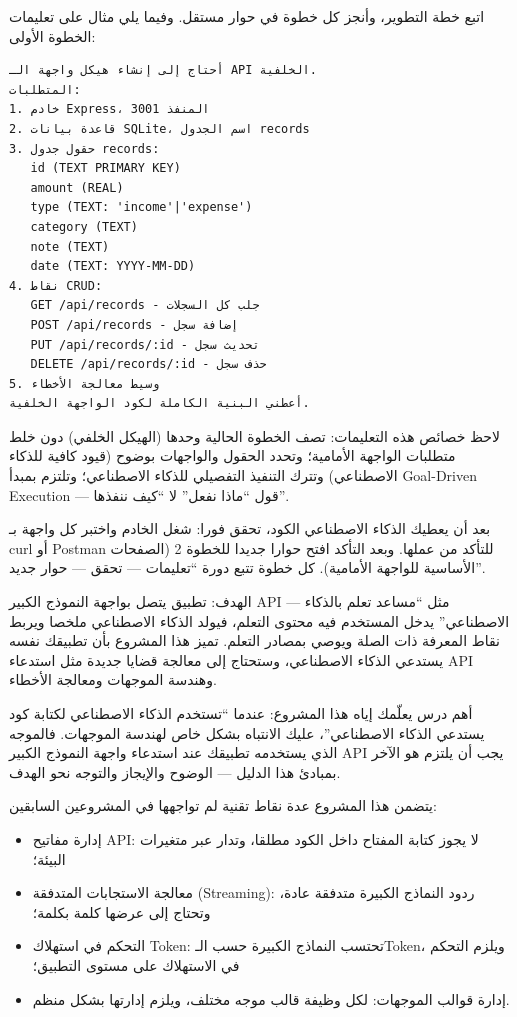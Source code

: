 
اتبع خطة التطوير، وأنجز كل خطوة في حوار مستقل. وفيما يلي مثال على تعليمات الخطوة الأولى:

\begin{lstlisting}
أحتاج إلى إنشاء هيكل واجهة الـ API الخلفية.
المتطلبات:
1. خادم Express، المنفذ 3001
2. قاعدة بيانات SQLite، اسم الجدول records
3. حقول جدول records:
   id (TEXT PRIMARY KEY)
   amount (REAL)
   type (TEXT: 'income'|'expense')
   category (TEXT)
   note (TEXT)
   date (TEXT: YYYY-MM-DD)
4. نقاط CRUD:
   GET /api/records - جلب كل السجلات
   POST /api/records - إضافة سجل
   PUT /api/records/:id - تحديث سجل
   DELETE /api/records/:id - حذف سجل
5. وسيط معالجة الأخطاء
أعطني البنية الكاملة لكود الواجهة الخلفية.
\end{lstlisting}

لاحظ خصائص هذه التعليمات: تصف الخطوة الحالية وحدها (الهيكل الخلفي) دون خلط متطلبات الواجهة الأمامية؛ وتحدد الحقول والواجهات بوضوح (قيود كافية للذكاء الاصطناعي) وتترك التنفيذ التفصيلي للذكاء الاصطناعي؛ وتلتزم بمبدأ Goal-Driven Execution — قول “ماذا نفعل” لا “كيف ننفذها”.

بعد أن يعطيك الذكاء الاصطناعي الكود، تحقق فورا: شغل الخادم واختبر كل واجهة بـ curl أو Postman للتأكد من عملها. وبعد التأكد افتح حوارا جديدا للخطوة 2 (الصفحات الأساسية للواجهة الأمامية). كل خطوة تتبع دورة “تعليمات — تحقق — حوار جديد”.



الهدف: تطبيق يتصل بواجهة النموذج الكبير API — مثل “مساعد تعلم بالذكاء الاصطناعي” يدخل المستخدم فيه محتوى التعلم، فيولد الذكاء الاصطناعي ملخصا ويربط نقاط المعرفة ذات الصلة ويوصي بمصادر التعلم. تميز هذا المشروع بأن تطبيقك نفسه يستدعي الذكاء الاصطناعي، وستحتاج إلى معالجة قضايا جديدة مثل استدعاء API وهندسة الموجهات ومعالجة الأخطاء.

أهم درس يعلّمك إياه هذا المشروع: عندما “تستخدم الذكاء الاصطناعي لكتابة كود يستدعي الذكاء الاصطناعي”، عليك الانتباه بشكل خاص لهندسة الموجهات. فالموجه الذي يستخدمه تطبيقك عند استدعاء واجهة النموذج الكبير API يجب أن يلتزم هو الآخر بمبادئ هذا الدليل — الوضوح والإيجاز والتوجه نحو الهدف.


يتضمن هذا المشروع عدة نقاط تقنية لم تواجهها في المشروعين السابقين:

\begin{itemize}
  \item إدارة مفاتيح API: لا يجوز كتابة المفتاح داخل الكود مطلقا، وتدار عبر متغيرات البيئة؛
  \item معالجة الاستجابات المتدفقة (Streaming): ردود النماذج الكبيرة متدفقة عادة، وتحتاج إلى عرضها كلمة بكلمة؛
  \item التحكم في استهلاك Token: تحتسب النماذج الكبيرة حسب الـToken، ويلزم التحكم في الاستهلاك على مستوى التطبيق؛
  \item إدارة قوالب الموجهات: لكل وظيفة قالب موجه مختلف، ويلزم إدارتها بشكل منظم.
\end{itemize}

